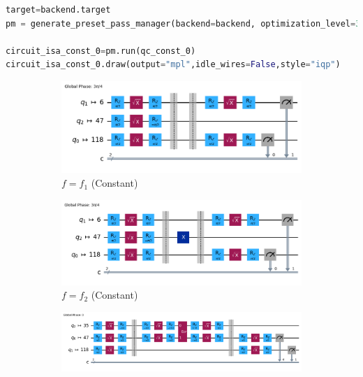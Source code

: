 \documentclass[12pt, oneside]{book}
\theoremstyle{definition}
\theoremstyle{definition}
\theoremstyle{remark}
\begin{document}
\begin{enumerate}
\begin{lstlisting}[language=Python]
target=backend.target
pm = generate_preset_pass_manager(backend=backend, optimization_level=3)

circuit_isa_const_0=pm.run(qc_const_0)
circuit_isa_const_0.draw(output="mpl",idle_wires=False,style="iqp")
\end{lstlisting}

\begin{figure}[H]
        \centering
        \begin{subfigure}[b]{0.45\linewidth}
        \centering
        \includegraphics[width=1\linewidth]{../images/deutsch_const_opt_0.png}
        \caption{$f=f_1$ (Constant)}
        \label{fig:deutsch_const_opt_f1}
        \end{subfigure}
        \hfill
        \centering
        \begin{subfigure}[b]{0.45\linewidth}
        \centering
        \includegraphics[width=1\linewidth]{../images/deutsch_const_opt_1.png}
        \caption{$f=f_2$ (Constant)}
        \label{fig:deutsch_const_opt_f2}
        \end{subfigure}
        \vspace{0.5 cm}
        \begin{subfigure}[b]{0.45\linewidth}
        \centering
        \includegraphics[width=1\linewidth]{../images/deutsch_jozsa_bal_opt_0.png}

\end{subfigure}
\end{figure}
\end{enumerate}
\end{document}
